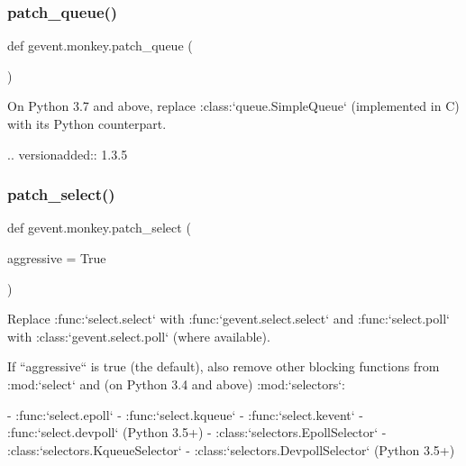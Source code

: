 \subsubsection{\texorpdfstring{patch\+\_\+queue()}{patch\_queue()}}
{\footnotesize\ttfamily def gevent.\+monkey.\+patch\+\_\+queue (\begin{DoxyParamCaption}{ }\end{DoxyParamCaption})}

\begin{DoxyVerb}On Python 3.7 and above, replace :class:`queue.SimpleQueue` (implemented
in C) with its Python counterpart.

.. versionadded:: 1.3.5
\end{DoxyVerb}
 \mbox{\label{namespacegevent_1_1monkey_a5307838fbb23c93e4f6d59c180738969}} 
\subsubsection{\texorpdfstring{patch\+\_\+select()}{patch\_select()}}
{\footnotesize\ttfamily def gevent.\+monkey.\+patch\+\_\+select (\begin{DoxyParamCaption}\item[{}]{aggressive = {\ttfamily True} }\end{DoxyParamCaption})}

\begin{DoxyVerb}Replace :func:`select.select` with :func:`gevent.select.select`
and :func:`select.poll` with :class:`gevent.select.poll` (where available).

If ``aggressive`` is true (the default), also remove other
blocking functions from :mod:`select` and (on Python 3.4 and
above) :mod:`selectors`:

- :func:`select.epoll`
- :func:`select.kqueue`
- :func:`select.kevent`
- :func:`select.devpoll` (Python 3.5+)
- :class:`selectors.EpollSelector`
- :class:`selectors.KqueueSelector`
- :class:`selectors.DevpollSelector` (Python 3.5+)
\end{DoxyVerb}
 \mbox{\label{namespacegevent_1_1monkey_a39402c98ba8110d30f262ea6a0594aee}} 
